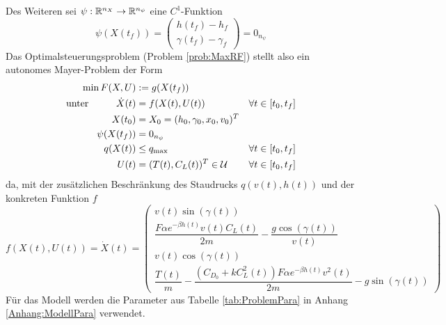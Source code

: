 Des Weiteren sei $\psi : \mathbb{R}^{n_X} \to \mathbb{R}^{n_{\psi}}$ eine $C^1$-Funktion
\[\psi(X(t_f)) = 
\begin{pmatrix}
    h(t_f) - h_f \\ 
    \gamma(t_f) - \gamma_f
\end{pmatrix} = 0_{n_{\psi}}\]
Das Optimalsteuerungsproblem (Problem \ref{prob:MaxRF}) stellt also ein autonomes Mayer-Problem der Form 
\begin{equation} \label{equ:mayer_problem}
    \begin{aligned}
        \min F(X,U) &:= g(X(t_f)) & & \\
        \text{unter}  \hspace{10mm} \dot{X}(t) &= f(X(t),U(t)) & & \forall t \in [t_0,t_f] \\
        X(t_0) &= X_0 = (h_0,\gamma_0,x_0,v_0)^T & & \\
        \psi(X(t_f)) &= 0_{n_{\psi}} & & \\
        q(X(t)) &\leq q_{\max} & & \forall t \in [t_0,t_f] \\
        U(t) &= (T(t),C_L(t))^T \in \mathcal{U}  & & \forall t \in [t_0,t_f] 
    \end{aligned}
\end{equation}
da, mit der zusätzlichen Beschränkung des Staudrucks $q(v(t),h(t))$ und der konkreten Funktion $f$
\begin{equation} \label{equ:state_space}
    f(X(t),U(t)) = \dot{X}(t) = \begin{pmatrix}
        v(t) \sin(\gamma(t)) \\ 
        \dfrac{F \alpha e^{-\beta h(t)} v(t) C_L(t)}{2m} - \dfrac{g \cos(\gamma(t))}{v(t)} \\ 
        v(t) \cos(\gamma(t)) \\ 
        \dfrac{T(t)}{m} - \dfrac{(C_{D_0} + k C_L^2(t)) F \alpha e^{-\beta h(t)} v^2(t)}{2m} - g \sin(\gamma(t))
    \end{pmatrix}
\end{equation}
Für das Modell werden die Parameter aus Tabelle \ref{tab:ProblemPara} in Anhang \ref{Anhang:ModellPara} verwendet.
